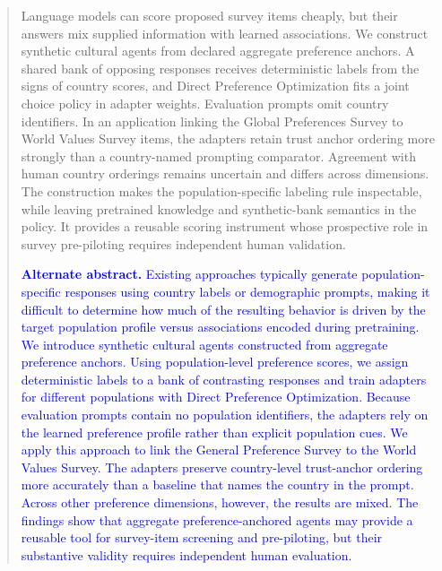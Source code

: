 \begin{abstract}
Language models can score proposed survey items cheaply, but their answers mix supplied information with learned associations. We construct synthetic cultural agents from declared aggregate preference anchors. A shared bank of opposing responses receives deterministic labels from the signs of country scores, and Direct Preference Optimization fits a joint choice policy in adapter weights. Evaluation prompts omit country identifiers. In an application linking the Global Preferences Survey to World Values Survey items, the adapters retain trust anchor ordering more strongly than a country-named prompting comparator. Agreement with human country orderings remains uncertain and differs across dimensions. The construction makes the population-specific labeling rule inspectable, while leaving pretrained knowledge and synthetic-bank semantics in the policy. It provides a reusable scoring instrument whose prospective role in survey pre-piloting requires independent human validation.

\medskip
\textcolor{blue}{\textbf{Alternate abstract.} Existing approaches typically generate population-specific responses using country labels or demographic prompts, making it difficult to determine how much of the resulting behavior is driven by the target population profile versus associations encoded during pretraining. We introduce synthetic cultural agents constructed from aggregate preference anchors. Using population-level preference scores, we assign deterministic labels to a bank of contrasting responses and train adapters for different populations with Direct Preference Optimization. Because evaluation prompts contain no population identifiers, the adapters rely on the learned preference profile rather than explicit population cues. We apply this approach to link the General Preference Survey to the World Values Survey. The adapters preserve country-level trust-anchor ordering more accurately than a baseline that names the country in the prompt. Across other preference dimensions, however, the results are mixed. The findings show that aggregate preference-anchored agents may provide a reusable tool for survey-item screening and pre-piloting, but their substantive validity requires independent human evaluation.}


\end{abstract}
